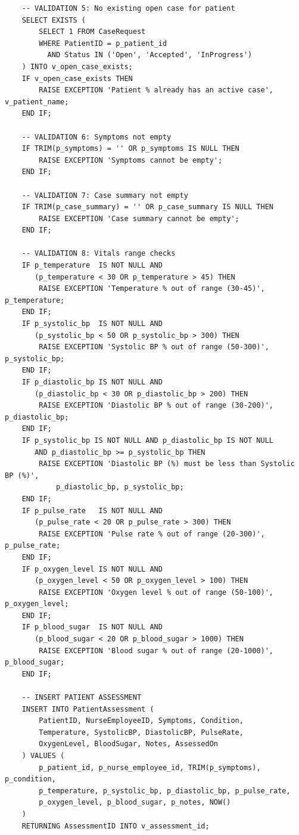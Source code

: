 \documentclass{article}
\begin{document}
\begin{lstlisting}
    -- VALIDATION 5: No existing open case for patient
    SELECT EXISTS (
        SELECT 1 FROM CaseRequest
        WHERE PatientID = p_patient_id
          AND Status IN ('Open', 'Accepted', 'InProgress')
    ) INTO v_open_case_exists;
    IF v_open_case_exists THEN
        RAISE EXCEPTION 'Patient % already has an active case', v_patient_name;
    END IF;

    -- VALIDATION 6: Symptoms not empty
    IF TRIM(p_symptoms) = '' OR p_symptoms IS NULL THEN
        RAISE EXCEPTION 'Symptoms cannot be empty';
    END IF;

    -- VALIDATION 7: Case summary not empty
    IF TRIM(p_case_summary) = '' OR p_case_summary IS NULL THEN
        RAISE EXCEPTION 'Case summary cannot be empty';
    END IF;

    -- VALIDATION 8: Vitals range checks
    IF p_temperature  IS NOT NULL AND
       (p_temperature < 30 OR p_temperature > 45) THEN
        RAISE EXCEPTION 'Temperature % out of range (30-45)', p_temperature;
    END IF;
    IF p_systolic_bp  IS NOT NULL AND
       (p_systolic_bp < 50 OR p_systolic_bp > 300) THEN
        RAISE EXCEPTION 'Systolic BP % out of range (50-300)', p_systolic_bp;
    END IF;
    IF p_diastolic_bp IS NOT NULL AND
       (p_diastolic_bp < 30 OR p_diastolic_bp > 200) THEN
        RAISE EXCEPTION 'Diastolic BP % out of range (30-200)', p_diastolic_bp;
    END IF;
    IF p_systolic_bp IS NOT NULL AND p_diastolic_bp IS NOT NULL
       AND p_diastolic_bp >= p_systolic_bp THEN
        RAISE EXCEPTION 'Diastolic BP (%) must be less than Systolic BP (%)',
            p_diastolic_bp, p_systolic_bp;
    END IF;
    IF p_pulse_rate   IS NOT NULL AND
       (p_pulse_rate < 20 OR p_pulse_rate > 300) THEN
        RAISE EXCEPTION 'Pulse rate % out of range (20-300)', p_pulse_rate;
    END IF;
    IF p_oxygen_level IS NOT NULL AND
       (p_oxygen_level < 50 OR p_oxygen_level > 100) THEN
        RAISE EXCEPTION 'Oxygen level % out of range (50-100)', p_oxygen_level;
    END IF;
    IF p_blood_sugar  IS NOT NULL AND
       (p_blood_sugar < 20 OR p_blood_sugar > 1000) THEN
        RAISE EXCEPTION 'Blood sugar % out of range (20-1000)', p_blood_sugar;
    END IF;

    -- INSERT PATIENT ASSESSMENT
    INSERT INTO PatientAssessment (
        PatientID, NurseEmployeeID, Symptoms, Condition,
        Temperature, SystolicBP, DiastolicBP, PulseRate,
        OxygenLevel, BloodSugar, Notes, AssessedOn
    ) VALUES (
        p_patient_id, p_nurse_employee_id, TRIM(p_symptoms), p_condition,
        p_temperature, p_systolic_bp, p_diastolic_bp, p_pulse_rate,
        p_oxygen_level, p_blood_sugar, p_notes, NOW()
    )
    RETURNING AssessmentID INTO v_assessment_id;


\end{lstlisting}
\end{document}
